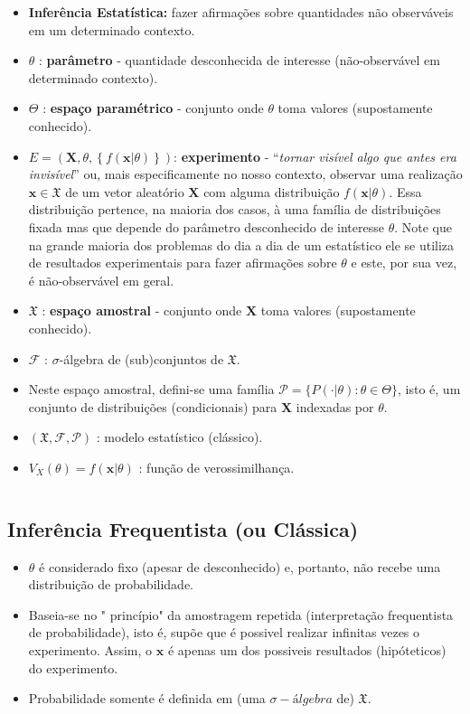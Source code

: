 \documentclass[
]{book}
\begin{document}
\begin{itemize}
\item
  \textbf{Inferência Estatística:} fazer afirmações sobre quantidades não observáveis em um determinado contexto.
\item
  \(\theta\) : \textbf{parâmetro} - quantidade desconhecida de interesse (não-observável em determinado contexto).
\item
  \(\Theta\) : \textbf{espaço paramétrico} - conjunto onde \(\theta\) toma valores (supostamente conhecido).
\item
  \(E=\left(\boldsymbol X, \theta, \left\{f(\boldsymbol x|\theta)\right\}\right)\): \textbf{experimento} - ``\emph{tornar visível algo que antes era invisível}'' ou, mais especificamente no nosso contexto, observar uma realização \(\boldsymbol x \in \mathfrak{X}\) de um vetor aleatório \(\boldsymbol X\) com alguma distribuição \(f(\boldsymbol x|\theta)\). Essa distribuição pertence, na maioria dos casos, à uma família de distribuições fixada mas que depende do parâmetro desconhecido de interesse \(\theta\). Note que na grande maioria dos problemas do dia a dia de um estatístico ele se utiliza de resultados experimentais para fazer afirmações sobre \(\theta\) e este, por sua vez, é não-observável em geral.
\item
  \(\mathfrak{X}\) : \textbf{espaço amostral} - conjunto onde \(\boldsymbol X\) toma valores (supostamente conhecido).
\item
  \(\mathcal{F}\) : \(\sigma\)-álgebra de (sub)conjuntos de \(\mathfrak{X}\).
\item
  Neste espaço amostral, defini-se uma família \(\mathcal{P}=\{P(\cdot|\theta): \theta \in \Theta\}\), isto é, um conjunto de distribuições (condicionais) para \(\boldsymbol X\) indexadas por \(\theta\).
\item
  \((\mathfrak{X},\mathcal{F},\mathcal{P})\) : modelo estatístico (clássico).
\item
  \(V_X(\theta)=f(\boldsymbol x |\theta)\) : função de verossimilhança.
\end{itemize}

\(~\)

\hypertarget{inferuxeancia-frequentista-ou-cluxe1ssica}{%
\subsection{Inferência Frequentista (ou Clássica)}\label{inferuxeancia-frequentista-ou-cluxe1ssica}}

\begin{itemize}
\item
  \(\theta\) é considerado fixo (apesar de desconhecido) e, portanto, não recebe uma distribuição de probabilidade.
\item
  Baseia-se no " princípio" da amostragem repetida (interpretação frequentista de probabilidade), isto é, supõe que é possivel realizar infinitas vezes o experimento. Assim, o \(\boldsymbol x\) é apenas um dos possiveis resultados (hipóteticos) do experimento.
\item
  Probabilidade somente é definida em (uma \(\sigma-álgebra\) de) \(\mathfrak{X}\).
\end{itemize}
\end{document}
